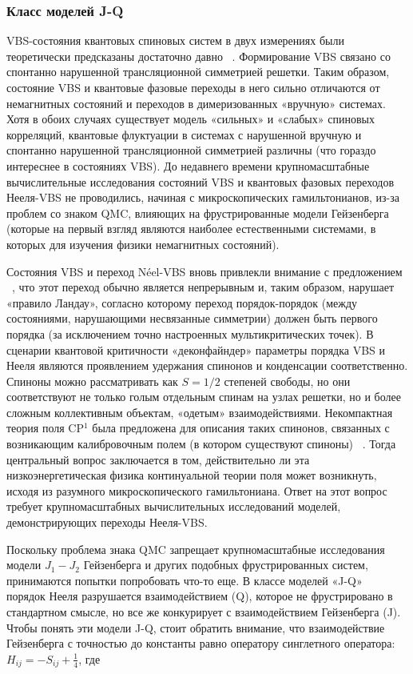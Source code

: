 \documentclass[11pt]{article}
\begin{document}
\subsubsection{Класс моделей J-Q}
VBS-состояния квантовых спиновых систем в двух измерениях были теоретически предсказаны достаточно давно ~\cite{prl_62_1694}. Формирование VBS связано со спонтанно нарушенной трансляционной симметрией решетки. Таким образом, состояние VBS и квантовые фазовые переходы в него сильно отличаются от немагнитных состояний и переходов в димеризованных «вручную» системах. Хотя в обоих случаях существует модель «сильных» и «слабых» спиновых корреляций, квантовые флуктуации в системах с нарушенной вручную и спонтанно нарушенной трансляционной симметрией различны (что гораздо интереснее в состояниях VBS). До недавнего времени крупномасштабные вычислительные исследования состояний VBS и квантовых фазовых переходов Нееля-VBS не проводились, начиная с микроскопических гамильтонианов, из-за проблем со знаком QMC, влияющих на фрустрированные модели Гейзенберга (которые на первый взгляд являются наиболее естественными системами, в которых для изучения физики немагнитных состояний).

Состояния VBS и переход Néel-VBS вновь привлекли внимание с предложением ~\cite{sc_303_1490}, что этот переход обычно является непрерывным и, таким образом, нарушает «правило Ландау», согласно которому переход порядок-порядок (между состояниями, нарушающими несвязанные симметрии) должен быть первого порядка (за исключением точно настроенных мультикритических точек).
В сценарии квантовой критичности «деконфайндер» параметры порядка VBS и Нееля являются проявлением удержания спинонов и конденсации соответственно. Спиноны можно рассматривать как $S = 1/2$ степеней свободы, но они соответствуют не только голым отдельным спинам на узлах решетки, но и более сложным коллективным объектам, «одетым» взаимодействиями. Некомпактная теория поля CP$^1$ была предложена для описания таких спинонов, связанных с возникающим калибровочным полем (в котором существуют спиноны) ~\cite{sc_303_1490}. Тогда центральный вопрос заключается в том, действительно ли эта низкоэнергетическая физика континуальной теории поля может возникнуть, исходя из разумного микроскопического гамильтониана. Ответ на этот вопрос требует крупномасштабных вычислительных исследований моделей, демонстрирующих переходы Нееля-VBS.

Поскольку проблема знака QMC запрещает крупномасштабные исследования модели $J_1 -J_2$ Гейзенберга и других подобных фрустрированных систем, принимаются попытки попробовать что-то еще. В классе моделей «J-Q» ~\cite{prl_98_227202, prb_80_180414, prb_82_174428} порядок Нееля разрушается взаимодействием (Q), которое не фрустрировано в стандартном смысле, но все же конкурирует с взаимодействием Гейзенберга (J). Чтобы понять эти модели J-Q, стоит обратить внимание, что взаимодействие Гейзенберга с точностью до константы равно оператору синглетного оператора: $H_{ij} = −S_{ij} + \frac{1}{4}$, где
\end{document}
